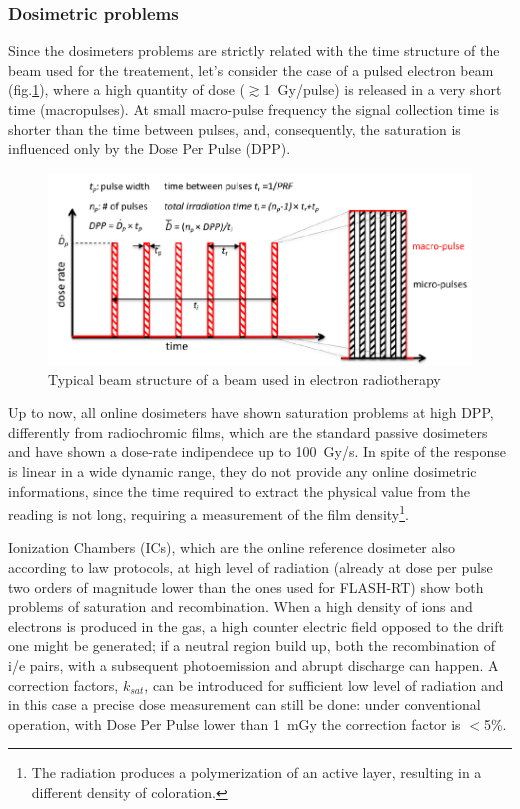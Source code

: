         \subsubsection{Dosimetric problems}
            Since the dosimeters problems are strictly related with the time structure of the beam used for the treatement, let's consider the case of a pulsed electron beam (fig.\ref{fig:beam_structure}), where a high quantity of dose ($\gtrsim$\SI{1}{Gy/pulse}) is released in a very short time (macropulses).            
            At small macro-pulse frequency the signal collection time is shorter than the time between pulses, and, consequently, the saturation is influenced only by the Dose Per Pulse (DPP).
            \begin{figure}
                \centering
                \includegraphics[width=.9\linewidth]{figures/test_beam/beam_structure.pdf}
                \caption{Typical beam structure of a beam used in electron radiotherapy}
                \label{fig:beam_structure}
            \end{figure} 
                    
            Up to now, all online dosimeters have shown saturation problems at high DPP, differently from radiochromic films, which are the standard passive dosimeters and have shown a dose-rate indipendece up to \SI{100}{Gy/s}.
            In spite of the response is linear in a wide dynamic range, they do not provide any online dosimetric informations, since the time required to extract the physical value from the reading is not long, requiring a measurement of the film density\footnote{The radiation produces a polymerization of an active layer, resulting in a different density of coloration.}.

            Ionization Chambers (ICs), which are the online reference dosimeter also according to law protocols, at high level of radiation (already at dose per pulse two orders of magnitude lower than the ones used for FLASH-RT) show both problems of saturation and recombination. When a high density of ions and electrons is produced in the gas, a high counter electric field opposed to the drift one might be generated; if a neutral region build up, both the recombination of i/e pairs, with a subsequent photoemission and abrupt discharge can happen. A correction factors, $k_{sat}$, can be introduced for sufficient low level of radiation and in this case a precise dose measurement can still be done: under conventional operation, with Dose Per Pulse lower than \SI{1}{mGy} the correction factor is $<$5\%. 

